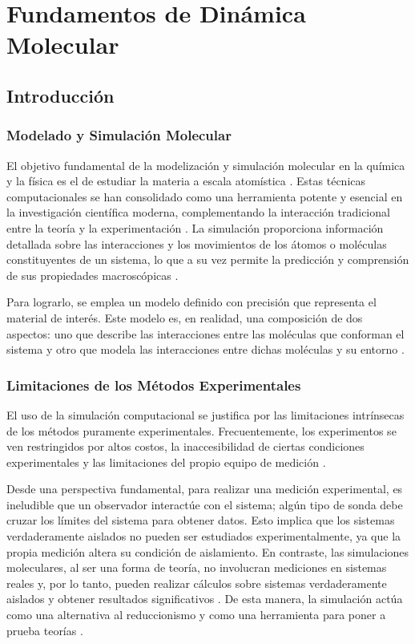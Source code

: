 \chapter{Fundamentos de Dinámica Molecular}

\section{Introducción}

\subsection{Modelado y Simulación Molecular}

El objetivo fundamental de la modelización y simulación molecular en la química y la física es el de estudiar la materia a escala atomística \cite[xxv]{zhou2022molecular}. Estas técnicas computacionales se han consolidado como una herramienta potente y esencial en la investigación científica moderna, complementando la interacción tradicional entre la teoría y la experimentación \cite[1]{zhou2022molecular}. La simulación proporciona información detallada sobre las interacciones y los movimientos de los átomos o moléculas constituyentes de un sistema, lo que a su vez permite la predicción y comprensión de sus propiedades macroscópicas \cite[xxv]{zhou2022molecular}.

Para lograrlo, se emplea un modelo definido con precisión que representa el material de interés. Este modelo es, en realidad, una composición de dos aspectos: uno que describe las interacciones entre las moléculas que conforman el sistema y otro que modela las interacciones entre dichas moléculas y su entorno \cite[26]{haile1992molecular}.

\subsection{Limitaciones de los Métodos Experimentales}

El uso de la simulación computacional se justifica por las limitaciones intrínsecas de los métodos puramente experimentales. Frecuentemente, los experimentos se ven restringidos por altos costos, la inaccesibilidad de ciertas condiciones experimentales y las limitaciones del propio equipo de medición \cite[1]{zhou2022molecular}.

Desde una perspectiva fundamental, para realizar una medición experimental, es ineludible que un observador interactúe con el sistema; algún tipo de sonda debe cruzar los límites del sistema para obtener datos. Esto implica que los sistemas verdaderamente aislados no pueden ser estudiados experimentalmente, ya que la propia medición altera su condición de aislamiento. En contraste, las simulaciones moleculares, al ser una forma de teoría, no involucran mediciones en sistemas reales y, por lo tanto, pueden realizar cálculos sobre sistemas verdaderamente aislados y obtener resultados significativos \cite[22]{haile1992molecular}. De esta manera, la simulación actúa como una alternativa al reduccionismo y como una herramienta para poner a prueba teorías \cite[24]{haile1992molecular}.

